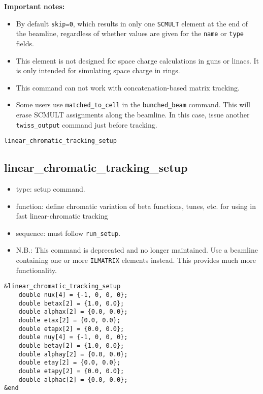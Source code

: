 \documentclass[11pt]{article}
\begin{document}
{\bf Important notes:}
\begin{itemize}
\item By default \verb|skip=0|, which results in only one \verb|SCMULT| element at the end of the beamline,
  regardless of whether values are given for the \verb|name| or \verb|type| fields.
\item This element is not designed for space charge calculations in guns or linacs.  It is only intended for
  simulating space charge in rings. 
\item This command can not work with concatenation-based matrix tracking.  
\item Some users use \verb|matched_to_cell| in the \verb|bunched_beam| command. 
  This will erase SCMULT assignments along the beamline. In this case, issue another \verb|twiss_output|
  command just before tracking.
\end{itemize}

\newpage
\begin{center}{\Large\verb|linear_chromatic_tracking_setup|}\end{center}
\subsection{linear\_chromatic\_tracking\_setup \label{subsec:linearchromatictrackingsetup}}

\begin{itemize}
\item type: setup command.
\item function: define chromatic variation of beta functions, tunes, etc. for using in
 fast linear-chromatic tracking
\item sequence: must follow \verb|run_setup|.
\item N.B.: This command is deprecated and no longer maintained. Use a beamline containing one or
  more \verb|ILMATRIX| elements instead. This provides much more functionality.
\end{itemize}

\begin{verbatim}
&linear_chromatic_tracking_setup
    double nux[4] = {-1, 0, 0, 0};
    double betax[2] = {1.0, 0.0};
    double alphax[2] = {0.0, 0.0};
    double etax[2] = {0.0, 0.0};
    double etapx[2] = {0.0, 0.0};
    double nuy[4] = {-1, 0, 0, 0};
    double betay[2] = {1.0, 0.0};
    double alphay[2] = {0.0, 0.0};
    double etay[2] = {0.0, 0.0};
    double etapy[2] = {0.0, 0.0};
    double alphac[2] = {0.0, 0.0};
&end
\end{verbatim}
\end{document}
